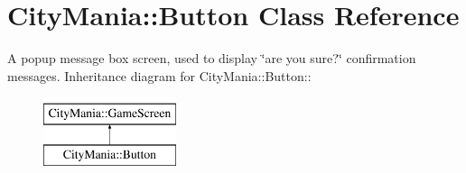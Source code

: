 \hypertarget{classCityMania_1_1Button}{
\section{CityMania::Button Class Reference}
\label{classCityMania_1_1Button}
}


A popup message box screen, used to display \char`\"{}are you sure?\char`\"{} confirmation messages.  
Inheritance diagram for CityMania::Button::\begin{figure}[H]
\begin{center}
\leavevmode
\includegraphics[height=2cm]{classCityMania_1_1Button}
\end{center}
\end{figure}
